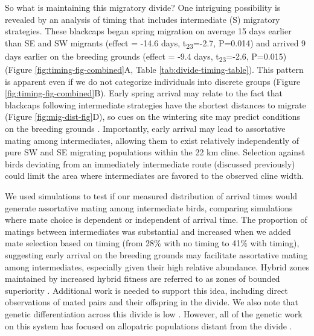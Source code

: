 \documentclass[a4paper, nobind]{templates/ociamthesis}
\begin{document}
So what is maintaining this migratory divide? One intriguing possibility is revealed by an analysis of timing that includes intermediate (S) migratory strategies. These blackcaps began spring migration on average 15 days earlier than SE and SW migrants (effect = -14.6 days, t\textsubscript{23}=-2.7, P=0.014) and arrived 9 days earlier on the breeding grounds (effect = -9.4 days, t\textsubscript{23}=-2.6, P=0.015) (Figure \ref{fig:timing-fig-combined}A, Table \ref{tab:divide-timing-table}). This pattern is apparent even if we do not categorize individuals into discrete groups (Figure \ref{fig:timing-fig-combined}B). Early spring arrival may relate to the fact that blackcaps following intermediate strategies have the shortest distances to migrate (Figure \ref{fig:mig-dist-fig}D), so cues on the wintering site may predict conditions on the breeding grounds \autocite{bothAvianPopulationConsequences2010,butlerDisproportionateEffectGlobal2003}. Importantly, early arrival may lead to assortative mating among intermediates, allowing them to exist relatively independently of pure SW and SE migrating populations within the 22 km cline. Selection against birds deviating from an immediately intermediate route (discussed previously) could limit the area where intermediates are favored to the observed cline width.

We used simulations to test if our measured distribution of arrival times would generate assortative mating among intermediate birds, comparing simulations where mate choice is dependent or independent of arrival time. The proportion of matings between intermediates was substantial and increased when we added mate selection based on timing (from 28\% with no timing to 41\% with timing), suggesting early arrival on the breeding grounds may facilitate assortative mating among intermediates, especially given their high relative abundance. Hybrid zones maintained by increased hybrid fitness are referred to as zones of bounded superiority \autocite{mooreEvaluationNarrowHybrid1977}. Additional work is needed to support this idea, including direct observations of mated pairs and their offspring in the divide. We also note that genetic differentiation across this divide is low \autocites[Delmore et al., manuscript in review; also see][]{rolshausenContemporaryEvolutionReproductive2009}{perez-trisHistoricalDiversificationMigration2004}. However, all of the genetic work on this system has focused on allopatric populations distant from the divide \autocite{muellerIdentificationGeneAssociated2011,perez-trisHistoricalDiversificationMigration2004,rolshausenContemporaryEvolutionReproductive2009,rolshausenIndividualDifferencesMigratory2013}.
\end{document}

